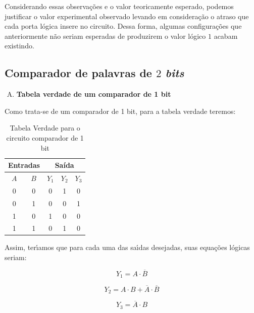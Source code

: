 \documentclass[12pt]{article}
\begin{document}
Considerando essas observações e o valor teoricamente esperado, podemos
justificar o valor experimental observado levando em consideração o atraso que
cada porta lógica insere no circuito. Dessa forma, algumas configurações que
anteriormente não seriam esperadas de produzirem o valor lógico $1$ acabam
existindo.

\subsection{Comparador de palavras de \(2\) \emph{bits}}\label{sec:comparador_de_palavras_3_bits}

\begin{enumerate}[A)]
\item \textbf{Tabela verdade de um comparador de 1 bit}
\end{enumerate}

Como trata-se de um comparador de 1 bit, para a tabela verdade teremos:

\begin{table}[H]
    \centering
    \caption{Tabela Verdade para o circuito comparador de 1 bit}
    \begin{tabular}{|c|c|c|c|c|}\hline
    \multicolumn{2}{|c|}{Entradas} & \multicolumn{3}{|c|}{Saída} \\\hline
    \textbf{$A$} & \textbf{$B$} & \textbf{$Y_{1}$} & \textbf{$Y_{2}$} & \textbf{$Y_{3}$} \\\hline
    0 & 0 & 0 & 1 & 0 \\\hline
    0 & 1 & 0 & 0 & 1\\\hline
    1 & 0 & 1 & 0 & 0\\\hline
    1 & 1 & 0 & 1 & 0\\\hline
    \end{tabular}\label{tab:comparador_de_palavras_3_bits}
\end{table}

Assim, terı́amos que para cada uma das saı́das desejadas, suas equações lógicas seriam:

\begin{equation}
Y_{1} = A \cdot \overline{B}
\end{equation}

\begin{equation}
Y_{2} = A \cdot B + \overline{A} \cdot \overline{B}
\end{equation}

\begin{equation}
Y_{3} = \overline{A} \cdot B
\end{equation}
\end{document}
